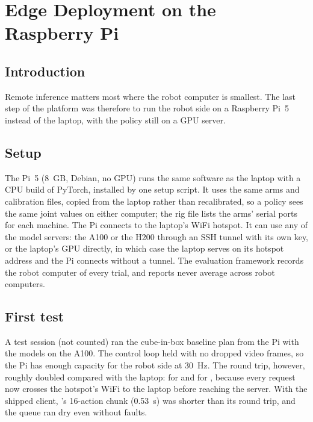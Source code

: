 \chapter{Edge Deployment on the Raspberry Pi}\label{ch:edge}

\section{Introduction}

Remote inference matters most where the robot computer is smallest. The last step of the platform was therefore to
run the robot side on a Raspberry Pi~5 instead of the laptop, with the policy still on a GPU server.

\section{Setup}

The Pi~5 (8~GB, Debian, no GPU) runs the same software as the laptop with a CPU build of PyTorch, installed by one
setup script. It uses the same arms and calibration files, copied from the laptop rather than recalibrated, so a
policy sees the same joint values on either computer; the rig file lists the arms' serial ports for each machine. The
Pi connects to the laptop's WiFi hotspot. It can use any of the model servers: the A100 or the H200 through an SSH
tunnel with its own key, or the laptop's GPU directly, in which case the laptop serves on its hotspot address and the
Pi connects without a tunnel. The evaluation framework records the robot computer of every trial, and reports never
average across robot computers.

\section{First test}\label{sec:edge-first}

A test session (not counted) ran the cube-in-box baseline plan from the Pi with the models on the A100. The control loop
held  with no dropped video frames, so the Pi has enough capacity for the robot side at 30~Hz. The round trip,
however, roughly doubled compared with the laptop:  for \smolvla{} and  for
\groot, because every request now crosses the hotspot's WiFi to the laptop before reaching the server. With the
shipped client, \groot's 16-action chunk (0.53~s) was shorter than its round trip, and the queue ran dry even without
faults.

